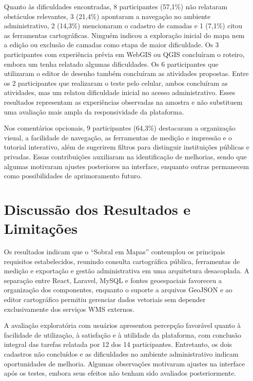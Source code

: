 \FloatBarrier

Quanto às dificuldades encontradas, 8 participantes (57,1\%) não relataram obstáculos relevantes, 3 (21,4\%) apontaram a navegação no ambiente administrativo, 2 (14,3\%) mencionaram o cadastro de camadas e 1 (7,1\%) citou as ferramentas cartográficas. Ninguém indicou a exploração inicial do mapa nem a edição ou exclusão de camadas como etapa de maior dificuldade. Os 3 participantes com experiência prévia em WebGIS ou QGIS concluíram o roteiro, embora um tenha relatado algumas dificuldades. Os 6 participantes que utilizaram o editor de desenho também concluíram as atividades propostas. Entre os 2 participantes que realizaram o teste pelo celular, ambos concluíram as atividades, mas um relatou dificuldade inicial no acesso administrativo. Esses resultados representam as experiências observadas na amostra e não substituem uma avaliação mais ampla da responsividade da plataforma.

Nos comentários opcionais, 9 participantes (64,3\%) destacaram a organização visual, a facilidade de navegação, as ferramentas de medição e impressão e o tutorial interativo, além de sugerirem filtros para distinguir instituições públicas e privadas. Essas contribuições auxiliaram na identificação de melhorias, sendo que algumas motivaram ajustes posteriores na interface, enquanto outras permanecem como possibilidades de aprimoramento futuro.

\section{Discussão dos Resultados e Limitações}
\label{sec:discussao-resultados}

Os resultados indicam que o ``Sobral em Mapas'' contemplou os principais requisitos estabelecidos, reunindo consulta cartográfica pública, ferramentas de medição e exportação e gestão administrativa em uma arquitetura desacoplada. A separação entre React, Laravel, MySQL e fontes geoespaciais favoreceu a organização dos componentes, enquanto o suporte a arquivos GeoJSON e ao editor cartográfico permitiu gerenciar dados vetoriais sem depender exclusivamente dos serviços WMS externos.

A avaliação exploratória com usuários apresentou percepção favorável quanto à facilidade de utilização, à satisfação e à utilidade da plataforma, com conclusão integral das tarefas relatada por 12 dos 14 participantes. Entretanto, os dois cadastros não concluídos e as dificuldades no ambiente administrativo indicam oportunidades de melhoria. Algumas observações motivaram ajustes na interface após os testes, embora seus efeitos não tenham sido avaliados posteriormente.


